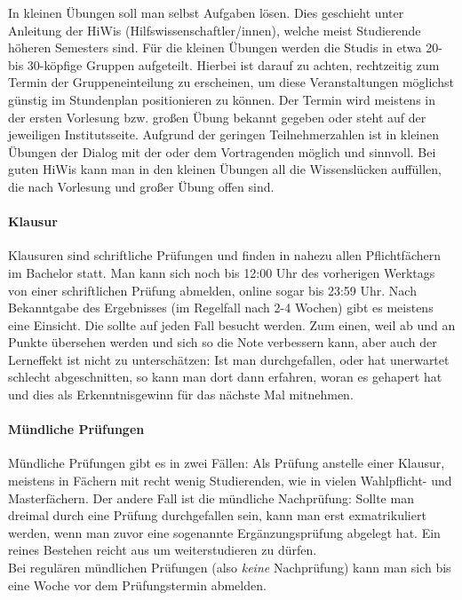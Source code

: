 	In kleinen Übungen soll man selbst Aufgaben lösen. Dies geschieht unter Anleitung der HiWis (Hilfswissenschaftler/innen), welche meist Studierende höheren Semesters sind. Für die kleinen Übungen werden die Studis in etwa 20- bis 30-köpfige Gruppen aufgeteilt. Hierbei ist darauf zu achten, rechtzeitig zum Termin der Gruppeneinteilung zu erscheinen, um diese Veranstaltungen möglichst günstig im Stundenplan positionieren zu können. Der Termin wird meistens in der ersten Vorlesung bzw. großen Übung bekannt gegeben oder steht auf der jeweiligen Institutsseite. Aufgrund der geringen Teilnehmerzahlen ist in kleinen Übungen der Dialog mit der oder dem Vortragenden möglich und sinnvoll. Bei guten HiWis kann man in den kleinen Übungen all die Wissenslücken auffüllen, die nach Vorlesung und großer Übung offen sind.
	
	\paragraph*{Klausur}
	Klausuren sind schriftliche Prüfungen und finden in nahezu allen Pflichtfächern im Bachelor statt. Man kann sich noch bis 12:00 Uhr des vorherigen Werktags von einer schriftlichen Prüfung abmelden, online sogar bis 23:59 Uhr. Nach Bekanntgabe des Ergebnisses (im Regelfall nach 2-4 Wochen) gibt es meistens eine Einsicht. Die sollte auf jeden Fall besucht werden. Zum einen, weil ab und an Punkte übersehen werden und sich so die Note verbessern kann, aber auch der Lerneffekt ist nicht zu unterschätzen: Ist man durchgefallen, oder hat unerwartet schlecht abgeschnitten, so kann man dort dann erfahren, woran es gehapert hat und dies als Erkenntnisgewinn für das nächste Mal mitnehmen.

	\paragraph*{Mündliche Prüfungen}
	Mündliche Prüfungen gibt es in zwei Fällen: Als Prüfung anstelle einer Klausur, meistens in Fächern mit recht wenig Studierenden, wie in vielen Wahlpflicht- und Masterfächern. 
	Der andere Fall ist die mündliche Nachprüfung: Sollte man dreimal durch eine Prüfung durchgefallen sein, kann man erst exmatrikuliert werden, wenn man zuvor eine sogenannte Ergänzungsprüfung abgelegt hat. Ein reines Bestehen reicht aus um weiterstudieren zu dürfen.\\
	Bei regulären mündlichen Prüfungen (also \emph{keine} Nachprüfung) kann man sich bis eine Woche vor dem Prüfungstermin abmelden.

